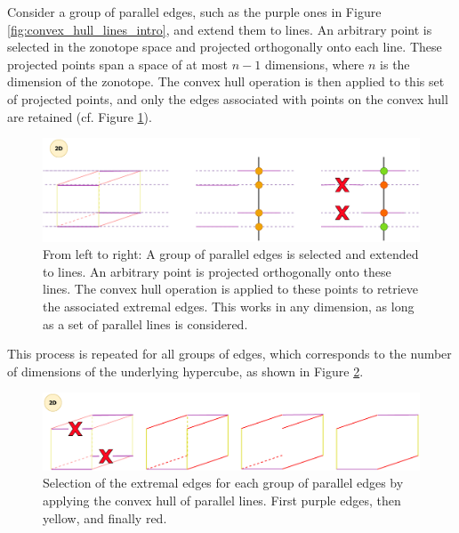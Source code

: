 Consider a group of parallel edges, such as the purple ones in Figure \ref{fig:convex_hull_lines_intro}, and extend them to lines. An arbitrary point is selected in the zonotope space and projected orthogonally onto each line. These projected points span a space of at most $n-1$ dimensions, where $n$ is the dimension of the zonotope. The convex hull operation is then applied to this set of projected points, and only the edges associated with points on the convex hull are retained (cf. Figure \ref{fig:convex_hull_lines}).

\begin{figure}[!htb]
  \captionsetup{justification=centering}
  
  \centering
  \includegraphics[trim={0 0 0 0},clip,width=1\linewidth]{img/chapter_2/zonotope_convex_hull_lines.pdf}

  \caption{From left to right: A group of parallel edges is selected and extended to lines. An arbitrary point is projected orthogonally onto these lines. The convex hull operation is applied to these points to retrieve the associated extremal edges. This works in any dimension, as long as a set of parallel lines is considered.}
  \label{fig:convex_hull_lines}
\end{figure}

This process is repeated for all groups of edges, which corresponds to the number of dimensions of the underlying hypercube, as shown in Figure \ref{fig:convex_hull_lines_repeat_groups}.

\begin{figure}[!htb]
  \captionsetup{justification=centering}
  
  \centering
  \includegraphics[trim={0 0 0 0},clip,width=1\linewidth]{img/chapter_2/zonotope_edge_elimination_repeat.pdf}

  \caption{Selection of the extremal edges for each group of parallel edges by applying the convex hull of parallel lines. First purple edges, then yellow, and finally red.}
  \label{fig:convex_hull_lines_repeat_groups}
\end{figure}

